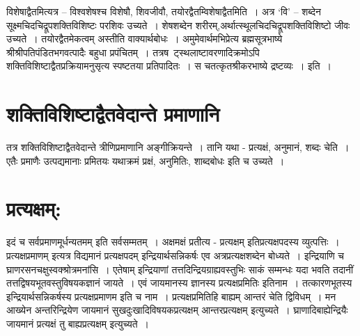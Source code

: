 {विशेषाद्वैतमित्यत्र – विश्वशेषश्च विशेषौ, शिवजीवौ, तयोरद्वैतम्विशेषाद्वैतमिति~। अत्र ‘वि’ – शब्देन सूक्ष्मचिदचिद्रूपशक्तिविशिष्टः परशिवः उच्यते~। शेषशब्देन शरीरम्,\break अर्थात्स्थूलचिदचिद्रूपशक्तिविशिष्टो जीवः उच्यते~। तयोरद्वैतमेकत्वम् अस्तीति वाक्यार्थबोधः~। अमुमेवार्थमभिप्रेत्य ब्रह्मसूत्रभाष्ये श्रीश्रीपतिपंडितभगवत्पादैः बहुधा प्रपंचितम्~। तत्र\break ष~ट्स्थलाष्टावरणादिक्रमोऽपि शक्तिविशिष्टाद्वैतप्रक्रियामनुसृत्य स्पष्टतया प्रतिपादितः~। स च\break तत्कृतश्रीकरभाष्ये द्रष्टव्यः~। इति~। 

\section*{शक्तिविशिष्टाद्वैतवेदान्ते प्रमाणानि}

तत्र शक्तिविशिष्टाद्वैतवेदान्ते त्रीणिप्रमाणानि अङ्गीक्रियन्ते~। तानि यथा - प्रत्यक्षं, अनुमानं, शब्दः चेति~। एतैः प्रमाणैः उत्पद्यमानाः प्रमितयः यथाक्रमं प्रक्षं, अनुमितिः, शाब्दबोधः इति च उच्यते~। 

\section*{प्रत्यक्षम्:}

इदं च सर्वप्रमाणमूर्धन्यतमम् इति सर्वसम्मतम्~। अक्षमक्षं प्रतीत्य - प्रत्यक्षम् इति\break प्रत्यक्षपदस्य व्युत्पत्तिः~। प्रत्यक्षप्रमाणम् इत्यत्र विद्यमानं प्रत्यक्षपदम् इन्द्रियार्थसन्निकर्षः एव अत्रप्रत्यक्षशब्देन बोध्यते~। इन्द्रियाणि च घ्राणरसनचक्षुस्वक्श्रोत्रमनांसि~। एतेषाम् इन्द्रियाणां तत्तदिन्द्रियग्राह्यवस्तुभिः साकं सम्मन्धः यदा भवति तदानीं तत्तद्विषयभूतवस्तुविषयकज्ञानं जायते~। एवं जायमानस्य ज्ञानस्य प्रत्यक्षप्रमितिः इतिनाम~। तत्कारणभूतस्य इन्द्रियार्थ\-सन्निकर्षस्य प्रत्यक्षप्रमाणम इति च नाम~। प्रत्यक्षप्रमितिहि बाह्यम् आन्तरं चेति द्विविधम्~। मन आख्येन अन्तरिन्द्रियेण जायमानं सुखदुःखादिविषयकप्रत्यक्षम् आन्तरप्रत्यक्षम् इत्युच्यते~। घ्राणादिबाह्येन्द्रियैः जायमानं प्रत्यक्षं तु बाह्यप्रत्यक्षम् इत्युच्यते~। 

}
